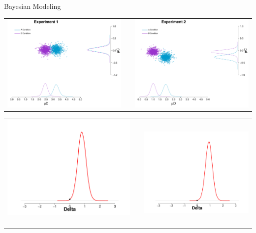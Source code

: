 \documentclass[final]{beamer}
\newlength{\onecolwid}
\newlength{\twocolwid}
\begin{document}
\begin{frame}[t]
\begin{columns}[t]
\begin{column}{\twocolwid}
\begin{columns}[t,totalwidth=\twocolwid]
\begin{column}{\onecolwid}
\begin{alertblock}{Bayesian Modeling}
\begin{enumerate}
\begin{center}
\begin{tabular}{ccc}
\includegraphics[width=0.45\linewidth]{Figures/Modelo_Delta_MeanDC_1.pdf} & \hfill & \includegraphics[width=0.45\linewidth]{Figures/Modelo_Delta_MeanDC_2.pdf}
\end{tabular}
\end{center}

\begin{center}
\begin{tabular}{ccc}
\includegraphics[width=0.3\linewidth]{Figures/Delta_1.pdf}  $\qquad$ $\qquad$ & \hfill & \includegraphics[width=0.3\linewidth]{Figures/Delta_2.pdf}
\end{tabular}
\end{center}



$\qquad$



\end{enumerate}
\end{alertblock}
\end{column}
\end{columns}
\end{column}
\end{columns}
\end{frame}
\end{document}
